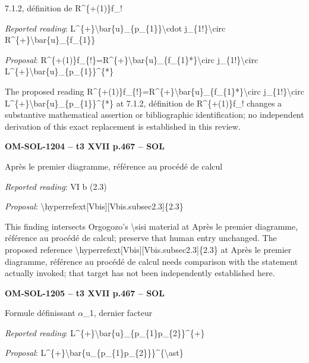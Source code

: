 7.1.2, définition de R\textasciicircum{}\{+(1)\}f\_!\par
\emph{Reported reading}: L\textasciicircum{}\{+\}\textbackslash{}bar\{u\}\_\{p\_\{1\}\}\textbackslash{}cdot j\_\{1!\}\textbackslash{}circ R\textasciicircum{}\{+\}\textbackslash{}bar\{u\}\_\{f\_\{1\}\}\par
\emph{Proposal}: R\textasciicircum{}\{+(1)\}f\_\{!\}=\allowbreak R\textasciicircum{}\{+\}\textbackslash{}bar\{u\}\_\{f\_\{1\}*\}\textbackslash{}circ j\_\{1!\}\textbackslash{}circ L\textasciicircum{}\{+\}\textbackslash{}bar\{u\}\_\{p\_\{1\}\}\textasciicircum{}\{*\}\par
The proposed reading R\textasciicircum{}\{+(1)\}f\_\{!\}=\allowbreak R\textasciicircum{}\{+\}\textbackslash{}bar\{u\}\_\{f\_\{1\}*\}\textbackslash{}circ j\_\{1!\}\textbackslash{}circ L\textasciicircum{}\{+\}\textbackslash{}bar\{u\}\_\{p\_\{1\}\}\textasciicircum{}\{*\} at 7.1.2, définition de R\textasciicircum{}\{+(1)\}f\_! changes a substantive mathematical assertion or bibliographic identification; no independent derivation of this exact replacement is established in this review.\par
\par\noindent\textbf{OM-SOL-1204 -- t3 XVII p.467 -- SOL}\par
Après le premier diagramme, référence au procédé de calcul\par
\emph{Reported reading}: VI b (2.3)\par
\emph{Proposal}: \textbackslash{}hyperrefext[Vbis][Vbis.subsec2.3]\{2.3\}\par
This finding intersects Orgogozo's \textbackslash{}sisi material at Après le premier diagramme, référence au procédé de calcul; preserve that human entry unchanged. The proposed reference \textbackslash{}hyperrefext[Vbis][Vbis.subsec2.3]\{2.3\} at Après le premier diagramme, référence au procédé de calcul needs comparison with the statement actually invoked; that target has not been independently established here.\par
\par\noindent\textbf{OM-SOL-1205 -- t3 XVII p.467 -- SOL}\par
Formule définissant \ensuremath{\alpha}\_1, dernier facteur\par
\emph{Reported reading}: L\textasciicircum{}\{+\}\textbackslash{}bar\{u\}\_\{p\_\{1\}p\_\{2\}\}\textasciicircum{}\{+\}\par
\emph{Proposal}: L\textasciicircum{}\{+\}\textbackslash{}bar\{u\_\{p\_\{1\}p\_\{2\}\}\}\textasciicircum{}\{\textbackslash{}ast\}\par
